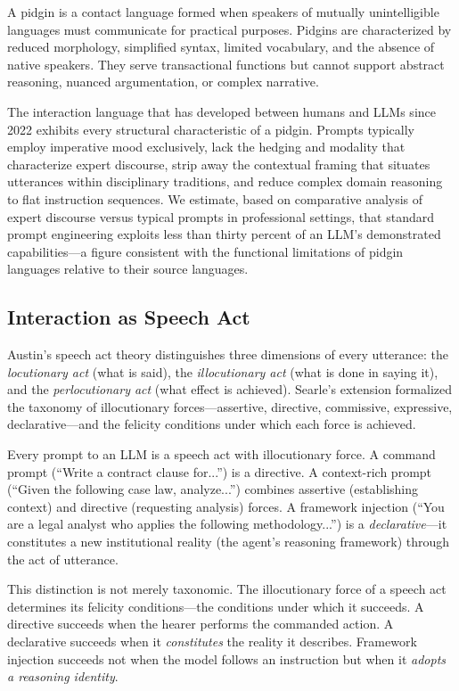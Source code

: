\documentclass[12pt,a4paper]{article}
\begin{document}
A pidgin is a contact language formed when speakers of mutually unintelligible languages must communicate for practical purposes. Pidgins are characterized by reduced morphology, simplified syntax, limited vocabulary, and the absence of native speakers. They serve transactional functions but cannot support abstract reasoning, nuanced argumentation, or complex narrative.

The interaction language that has developed between humans and LLMs since 2022 exhibits every structural characteristic of a pidgin. Prompts typically employ imperative mood exclusively, lack the hedging and modality that characterize expert discourse, strip away the contextual framing that situates utterances within disciplinary traditions, and reduce complex domain reasoning to flat instruction sequences. We estimate, based on comparative analysis of expert discourse versus typical prompts in professional settings, that standard prompt engineering exploits less than thirty percent of an LLM's demonstrated capabilities---a figure consistent with the functional limitations of pidgin languages relative to their source languages.

\subsection{Interaction as Speech Act}

Austin's speech act theory \cite{austin1962} distinguishes three dimensions of every utterance: the \emph{locutionary act} (what is said), the \emph{illocutionary act} (what is done in saying it), and the \emph{perlocutionary act} (what effect is achieved). Searle's extension \cite{searle1969} formalized the taxonomy of illocutionary forces---assertive, directive, commissive, expressive, declarative---and the felicity conditions under which each force is achieved.

Every prompt to an LLM is a speech act with illocutionary force. A command prompt (``Write a contract clause for...'') is a directive. A context-rich prompt (``Given the following case law, analyze...'') combines assertive (establishing context) and directive (requesting analysis) forces. A framework injection (``You are a legal analyst who applies the following methodology...'') is a \emph{declarative}---it constitutes a new institutional reality (the agent's reasoning framework) through the act of utterance.

This distinction is not merely taxonomic. The illocutionary force of a speech act determines its felicity conditions---the conditions under which it succeeds. A directive succeeds when the hearer performs the commanded action. A declarative succeeds when it \emph{constitutes} the reality it describes. Framework injection succeeds not when the model follows an instruction but when it \emph{adopts a reasoning identity}.
\end{document}
